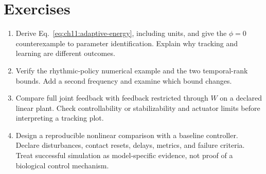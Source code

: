 \section*{Exercises}
\begin{enumerate}
 \item Derive Eq.~\eqref{eq:ch11:adaptive-energy}, including units, and give the
 $\phi=0$ counterexample to parameter identification. Explain why tracking and
 learning are different outcomes.
 \item Verify the rhythmic-policy numerical example and the two temporal-rank
 bounds. Add a second frequency and examine which bound changes.
 \item Compare full joint feedback with feedback restricted through $W$ on a
 declared linear plant. Check controllability or stabilizability and actuator
 limits before interpreting a tracking plot.
 \item Design a reproducible nonlinear comparison with a baseline controller.
 Declare disturbances, contact resets, delays, metrics, and failure criteria.
 Treat successful simulation as model-specific evidence, not proof of a
 biological control mechanism.
\end{enumerate}
